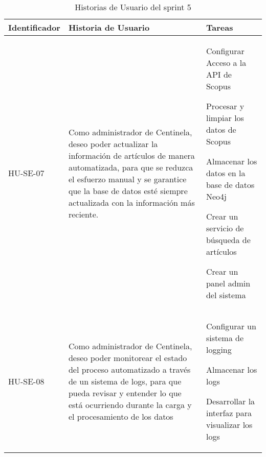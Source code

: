 \begin{table}[!t]
    \centering
    \begin{tabular}{|p{2.5cm}|p{5cm}|p{6cm}|}
        \midrule
        \textbf{Identificador} & \textbf{Historia de Usuario}                                                                                                                                                                        & \textbf{Tareas} \\
        \hline
        HU-SE-07 & Como administrador de Centinela, deseo poder actualizar la información de artículos de manera automatizada, para que se reduzca el esfuerzo manual y se garantice que la base de datos esté siempre actualizada con la información más reciente. &
        \begin{compactitem}
            \item Configurar Acceso a la API de Scopus
            \item Procesar y limpiar los datos de Scopus
            \item Almacenar los datos en la base de datos Neo4j
            \item Crear un servicio de búsqueda de artículos
            \item Crear un panel admin del sistema 
        \end{compactitem}
        \\\hline
        HU-SE-08 & Como administrador de Centinela, deseo poder monitorear el estado del proceso automatizado a través de un sistema de logs, para que pueda revisar y entender lo que está ocurriendo durante la carga y el procesamiento de los datos &
                \begin{compactitem}
            \item Configurar un sistema de logging
            \item Almacenar los logs
            \item Desarrollar la interfaz para visualizar los logs
        \end{compactitem}
        \\\hline
    \end{tabular}
    \caption{Historias de Usuario del sprint 5}\label{C2T5:Historias de Usuario del Sprint 5}%
\end{table}
